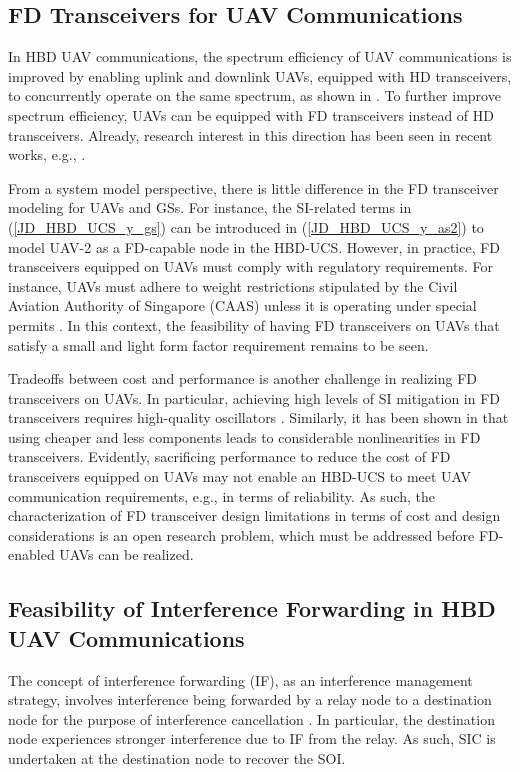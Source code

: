 \subsection{FD Transceivers for UAV Communications}
In HBD UAV communications, the spectrum efficiency of UAV communications is improved by enabling uplink and downlink UAVs, equipped with HD transceivers, to concurrently operate on the same spectrum, as shown in \cite{tan2018joint}. To further improve spectrum efficiency, UAVs can be equipped with FD transceivers instead of HD transceivers. Already, research interest in this direction has been seen in recent works, e.g., \cite{zhang2019framework,wang2018spectrum,song2019joint}. 

From a system model perspective, there is little difference in the FD transceiver modeling for UAVs and GSs. For instance, the SI-related terms in (\ref{JD_HBD_UCS_y_gs}) can be introduced in (\ref{JD_HBD_UCS_y_as2}) to model UAV-2 as a FD-capable node in the HBD-UCS. However, in practice, FD transceivers equipped on UAVs must comply with regulatory requirements. For instance, UAVs must adhere to weight restrictions stipulated by the Civil Aviation Authority of Singapore (CAAS) unless it is operating under special permits \cite{caas2019uas}. In this context, the feasibility of having FD transceivers on UAVs that satisfy a small and light form factor requirement remains to be seen. 

Tradeoffs between cost and performance is another challenge in realizing FD transceivers on UAVs. In particular, achieving high levels of SI mitigation in FD transceivers requires high-quality oscillators \cite{korpi2014full}. Similarly, it has been shown in \cite{syrjala2016analysis} that using cheaper and less components leads to considerable nonlinearities in FD transceivers. Evidently, sacrificing performance to reduce the cost of FD transceivers equipped on UAVs may not enable an HBD-UCS to meet UAV communication requirements, e.g., in terms of reliability. As such, the characterization of FD transceiver design limitations in terms of cost and design considerations is an open research problem, which must be addressed before FD-enabled UAVs can be realized.

\subsection{Feasibility of Interference Forwarding in HBD UAV Communications}

The concept of interference forwarding (IF), as an interference management strategy, involves interference being forwarded by a relay node to a destination node for the purpose of interference cancellation \cite{sirigina2016symbol,sirigina2016full}. In particular, the destination node experiences stronger interference due to IF from the relay. As such, SIC is undertaken at the destination node to recover the SOI.

